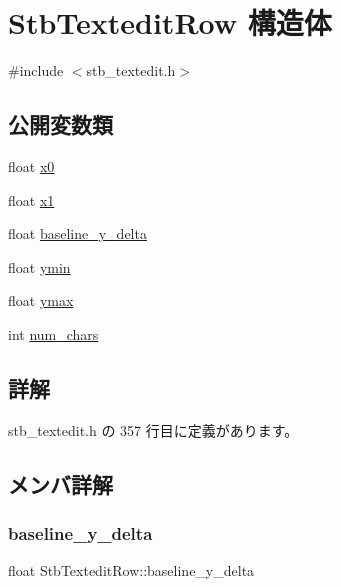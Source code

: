 \hypertarget{struct_stb_textedit_row}{}\section{Stb\+Textedit\+Row 構造体}
\label{struct_stb_textedit_row}


{\ttfamily \#include $<$stb\+\_\+textedit.\+h$>$}

\subsection*{公開変数類}
\begin{DoxyCompactItemize}
\item 
float \mbox{\hyperlink{struct_stb_textedit_row_af30b3e1d61d1acea26d3e0ebec2cb81d}{x0}}
\item 
float \mbox{\hyperlink{struct_stb_textedit_row_a3a3e1a506030c871a1b3d09bf26e341f}{x1}}
\item 
float \mbox{\hyperlink{struct_stb_textedit_row_ad2d72b74b1a61e331949c7f7ec311880}{baseline\+\_\+y\+\_\+delta}}
\item 
float \mbox{\hyperlink{struct_stb_textedit_row_a707d331bd9dc99d64c81f71106b75eed}{ymin}}
\item 
float \mbox{\hyperlink{struct_stb_textedit_row_aab290e15f6a3b4a96ab2c2472cc8a7a5}{ymax}}
\item 
int \mbox{\hyperlink{struct_stb_textedit_row_a1a19bebadb3f82b4f86ea29698d77084}{num\+\_\+chars}}
\end{DoxyCompactItemize}


\subsection{詳解}


 stb\+\_\+textedit.\+h の 357 行目に定義があります。



\subsection{メンバ詳解}
\mbox{\label{struct_stb_textedit_row_ad2d72b74b1a61e331949c7f7ec311880}} 
\subsubsection{\texorpdfstring{baseline\+\_\+y\+\_\+delta}{baseline\_y\_delta}}
{\footnotesize\ttfamily float Stb\+Textedit\+Row\+::baseline\+\_\+y\+\_\+delta}



